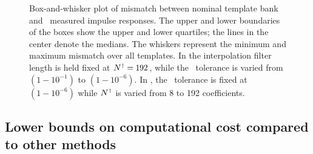 \begin{figure}[b]
	\caption{Box-and-whisker plot of mismatch between nominal
template bank and \lloid\ measured impulse responses.  The upper and lower boundaries of
the boxes show the upper and lower quartiles; the lines in the center denote the medians.
The whiskers represent the minimum and maximum mismatch over all templates.  In 
 the interpolation filter length is held fixed
at $N^\shortuparrow = 192$, while the \SVD\ tolerance is varied from
$\left(1-10^{-1}\right)$ to $\left(1-10^{-6}\right)$.  In , the \SVD\ tolerance is fixed at $\left(1-10^{-6}\right)$ while $N^\shortuparrow$ is varied from 8 to 192 coefficients.}
\end{figure}

\subsection{Lower bounds on computational cost compared to other methods}

